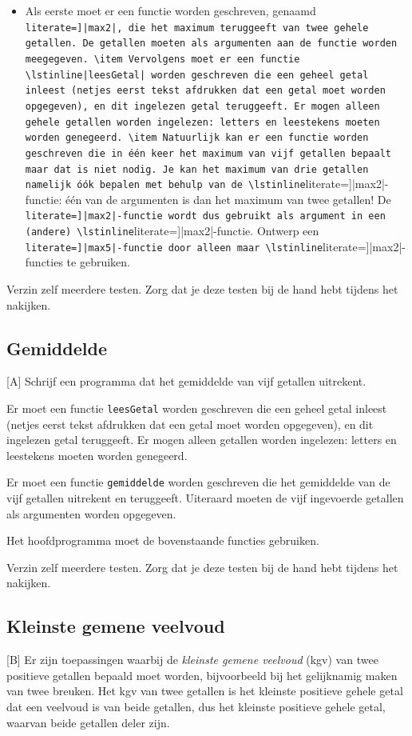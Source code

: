 \documentclass[a4paper,10pt,fleqn,twoside]{article}
\begin{document}
\begin{itemize}
\item Als eerste moet er een functie worden geschreven, genaamd \lstinline[literate=]|max2|, die het maximum teruggeeft van twee gehele getallen. De getallen moeten als argumenten aan de functie worden meegegeven.
\item Vervolgens moet er een functie \lstinline|leesGetal| worden geschreven die een geheel getal inleest (netjes eerst tekst afdrukken dat een getal moet worden opgegeven), en dit ingelezen getal teruggeeft. Er mogen alleen gehele getallen worden ingelezen: letters en leestekens moeten worden genegeerd.
\item Natuurlijk kan er een functie worden geschreven die in één keer het maximum van vijf getallen bepaalt maar dat is niet nodig. Je kan het maximum van drie getallen namelijk óók bepalen met behulp van de \lstinline[literate=]|max2|-functie: één van de argumenten is dan het maximum van twee getallen! De \lstinline[literate=]|max2|-functie wordt dus gebruikt als argument in een (andere) \lstinline[literate=]|max2|-functie. Ontwerp een \lstinline[literate=]|max5|-functie door alleen maar \lstinline[literate=]|max2|-functies te gebruiken.
\end{itemize}

Verzin zelf meerdere testen. Zorg dat je deze testen bij de hand hebt tijdens het nakijken.

\subsection{Gemiddelde}[A]
Schrijf een programma dat het gemiddelde van vijf getallen uitrekent.

Er moet een functie \lstinline|leesGetal| worden geschreven die een geheel getal inleest (netjes eerst tekst afdrukken dat een getal moet worden opgegeven), en dit ingelezen getal teruggeeft. Er mogen alleen getallen worden ingelezen: letters en leestekens moeten worden genegeerd.

Er moet een functie \lstinline|gemiddelde| worden geschreven die het gemiddelde van de vijf getallen uitrekent en teruggeeft. Uiteraard moeten de vijf ingevoerde getallen als argumenten worden opgegeven.

Het hoofdprogramma moet de bovenstaande functies gebruiken.

Verzin zelf meerdere testen. Zorg dat je deze testen bij de hand hebt tijdens het nakijken.

\subsection{Kleinste gemene veelvoud}[B]
Er zijn toepassingen waarbij de \textsl{kleinste gemene veelvoud} (kgv) van twee positieve getallen bepaald moet worden, bijvoorbeeld bij het gelijknamig maken van twee breuken. Het kgv van twee getallen is het kleinste positieve gehele getal dat een veelvoud is van beide getallen, dus het kleinste positieve gehele getal, waarvan beide getallen deler zijn.
\end{document}
